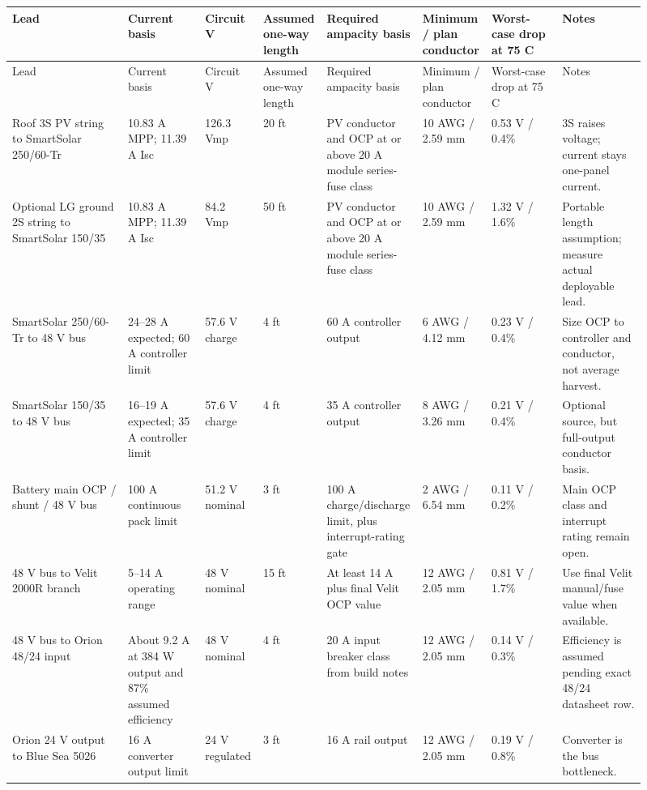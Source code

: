 \documentclass[10pt]{article}
\begin{document}
{\scriptsize
\begin{longtable}{@{}L{0.18\linewidth}L{0.12\linewidth}L{0.07\linewidth}L{0.08\linewidth}L{0.12\linewidth}L{0.10\linewidth}L{0.11\linewidth}L{0.13\linewidth}@{}}
\toprule
Lead & Current basis & Circuit V & Assumed one-way length & Required ampacity basis & Minimum / plan conductor & Worst-case drop at 75 C & Notes \\
\midrule
\endfirsthead
\toprule
Lead & Current basis & Circuit V & Assumed one-way length & Required ampacity basis & Minimum / plan conductor & Worst-case drop at 75 C & Notes \\
\midrule
\endhead
Roof 3S PV string to SmartSolar 250/60-Tr & 10.83 A MPP; 11.39 A Isc & 126.3 Vmp & 20 ft & PV conductor and OCP at or above 20 A module series-fuse class & 10 AWG / 2.59 mm & 0.53 V / 0.4\% & 3S raises voltage; current stays one-panel current. \\
Optional LG ground 2S string to SmartSolar 150/35 & 10.83 A MPP; 11.39 A Isc & 84.2 Vmp & 50 ft & PV conductor and OCP at or above 20 A module series-fuse class & 10 AWG / 2.59 mm & 1.32 V / 1.6\% & Portable length assumption; measure actual deployable lead. \\
SmartSolar 250/60-Tr to 48 V bus & 24--28 A expected; 60 A controller limit & 57.6 V charge & 4 ft & 60 A controller output & 6 AWG / 4.12 mm & 0.23 V / 0.4\% & Size OCP to controller and conductor, not average harvest. \\
SmartSolar 150/35 to 48 V bus & 16--19 A expected; 35 A controller limit & 57.6 V charge & 4 ft & 35 A controller output & 8 AWG / 3.26 mm & 0.21 V / 0.4\% & Optional source, but full-output conductor basis. \\
Battery main OCP / shunt / 48 V bus & 100 A continuous pack limit & 51.2 V nominal & 3 ft & 100 A charge/discharge limit, plus interrupt-rating gate & 2 AWG / 6.54 mm & 0.11 V / 0.2\% & Main OCP class and interrupt rating remain open. \\
48 V bus to Velit 2000R branch & 5--14 A operating range & 48 V nominal & 15 ft & At least 14 A plus final Velit OCP value & 12 AWG / 2.05 mm & 0.81 V / 1.7\% & Use final Velit manual/fuse value when available. \\
48 V bus to Orion 48/24 input & About 9.2 A at 384 W output and 87\% assumed efficiency & 48 V nominal & 4 ft & 20 A input breaker class from build notes & 12 AWG / 2.05 mm & 0.14 V / 0.3\% & Efficiency is assumed pending exact 48/24 datasheet row. \\
Orion 24 V output to Blue Sea 5026 & 16 A converter output limit & 24 V regulated & 3 ft & 16 A rail output & 12 AWG / 2.05 mm & 0.19 V / 0.8\% & Converter is the bus bottleneck. \\

\end{longtable}}
\end{document}
